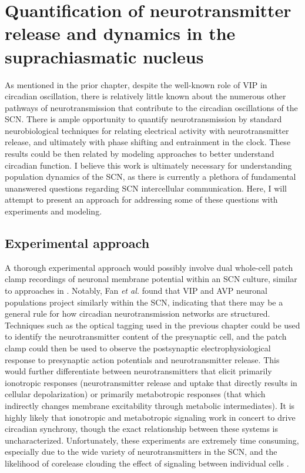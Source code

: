 \section{Quantification of neurotransmitter release and dynamics in the suprachiasmatic nucleus}
As mentioned in the prior chapter, despite the well-known role of VIP in circadian oscillation, there is relatively little known about the numerous other pathways of neurotransmission that contribute to the circadian oscillations of the SCN.
There is ample opportunity to quantify neurotransmission by standard neurobiological techniques for relating electrical activity with neurotransmitter release, and ultimately with phase shifting and entrainment in the clock.
These results could be then related by modeling approaches to better understand circadian function.
I believe this work is ultimately necessary for understanding population dynamics of the SCN, as there is currently a plethora of fundamental unanswered questions regarding SCN intercellular communication.
Here, I will attempt to present an approach for addressing some of these questions with experiments and modeling.

\subsection*{Experimental approach}
A thorough experimental approach would possibly involve dual whole-cell patch clamp recordings of neuronal membrane potential within an SCN culture, similar to approaches in \cite{Fan2015}.
Notably, Fan \textit{et al.} found that VIP and AVP neuronal populations project similarly within the SCN, indicating that there may be a general rule for how circadian neurotransmission networks are structured.
Techniques such as the optical tagging used in the previous chapter could be used to identify the neurotransmitter content of the presynaptic cell, and the patch clamp could then be used to observe the postsynaptic electrophysiological response to presynaptic action potentials and neurotransmitter release.
This would further differentiate between neurotransmitters that elicit primarily ionotropic responses (neurotransmitter release and uptake that directly results in cellular depolarization) or primarily metabotropic responses (that which indirectly changes membrane excitability through metabolic intermediates).
It is highly likely that ionotropic and metabotropic signaling work in concert to drive circadian synchrony, though the exact relationship between these systems is uncharacterized.
Unfortunately, these experiments are extremely time consuming, especially due to the wide variety of neurotransmitters in the SCN, and the likelihood of corelease clouding the effect of signaling between individual cells \cite{Herzog2017}.

